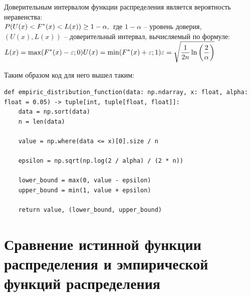 \documentclass[a4paper,14pt]{extarticle}
\begin{document}
    Доверительным интервалом функции распределения является вероятность неравенства: \\
    $\displaystyle
    P(U(x) < F^*(x) < L(x)) \geq 1 - \alpha, \\
    $
    где $1 - \alpha$ -- уровень доверия, $(U(x), L(x))$ -- доверительный интервал, вычисляемый по формуле: \\
    $\displaystyle
    L(x) = \max(F^*(x) - \varepsilon; 0) \\
    U(x) = \min(F^*(x) + \varepsilon; 1) \\
    \varepsilon = \sqrt{\displaystyle \frac{1}{2n} \ln \left(\frac{2}{\alpha} \right)}
    $

    Таким образом код для него вышел таким:
    \begin{verbatim}
def empiric_distribution_function(data: np.ndarray, x: float, alpha: float = 0.05) -> tuple[int, tuple[float, float]]:
    data = np.sort(data)
    n = len(data)
    
    value = np.where(data <= x)[0].size / n

    epsilon = np.sqrt(np.log(2 / alpha) / (2 * n))
    
    lower_bound = max(0, value - epsilon)
    upper_bound = min(1, value + epsilon)
    
    return value, (lower_bound, upper_bound)
    \end{verbatim}

    \section{Сравнение истинной функции распределения и эмпирической функций распределения}
\end{document}

